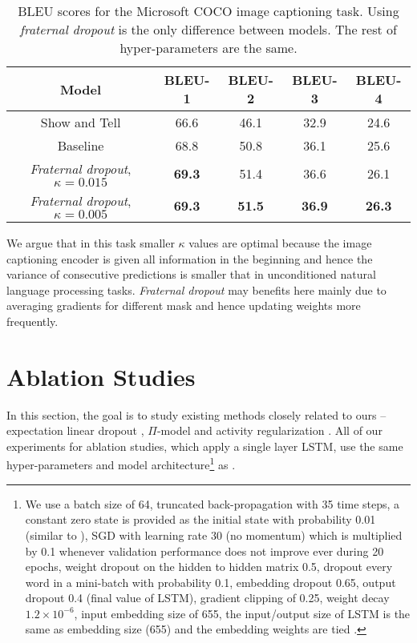 \documentclass{article} \usepackage{iclr2018_conference,times}
\begin{document}
\begin{table}[t]
\vspace{-0.08cm}
\centering
\begin{tabular}{c | c c c c} 
\textbf{Model} & \textbf{BLEU-1} & \textbf{BLEU-2} & \textbf{BLEU-3} & \textbf{BLEU-4}\\
\hline
Show and Tell \cite{DBLP:journals/corr/XuBKCCSZB15} & 66.6 & 46.1 & 32.9 & 24.6\\
\hline
Baseline & 68.8 & 50.8 & 36.1 & 25.6 \\
\emph{Fraternal dropout}, $\kappa = 0.015$ & \textbf{69.3} & 51.4 & 36.6 & 26.1\\
\emph{Fraternal dropout}, $\kappa = 0.005$ & \textbf{69.3} & \textbf{51.5} & \textbf{36.9} & \textbf{26.3}\\
\end{tabular}
\caption{BLEU scores for the Microsoft COCO image captioning task. Using \emph{fraternal dropout} is the only difference between models. The rest of hyper-parameters are the same.}
\label{table:MSCOCO}
\vspace{-0.08cm}
\end{table}

We argue that in this task smaller $\kappa$ values are optimal because the image captioning encoder is given all information in the beginning and hence the variance of consecutive predictions is smaller that in unconditioned natural language processing tasks. \emph{Fraternal dropout} may benefits here mainly due to averaging gradients for different mask and hence updating weights more frequently.





\section{Ablation Studies}
\label{sec_ablation}
In this section, the goal is to study existing methods closely related to ours -- expectation linear dropout \cite{ma2016dropout}, $\Pi$-model \cite{laine2016temporal} and activity regularization \cite{ar_tar}. All of our experiments for ablation studies, which apply a single layer LSTM, use the same hyper-parameters and model architecture\footnote{We use a batch size of 64, truncated back-propagation with 35 time steps, a constant zero state is provided as the initial state with probability 0.01 (similar to \cite{melis2017state}), SGD with learning rate 30 (no momentum) which is multiplied by 0.1 whenever validation performance does not improve ever during 20 epochs, weight dropout on the hidden to hidden matrix 0.5, dropout every word in a mini-batch with probability 0.1, embedding dropout 0.65, output dropout 0.4 (final value of LSTM), gradient clipping of 0.25, weight decay $1.2\times 10^{-6}$, input embedding size of 655, the input/output size of LSTM is the same as embedding size (655) and the embedding weights are tied \citep{inan2016tying, press2016using}.} as \citet{melis2017state}.
\end{document}

